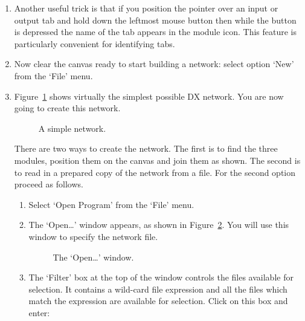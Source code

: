 \documentclass[twoside,11pt]{article}
\begin{document}
\begin{enumerate}
  \item Another useful trick is that if you position the pointer over
   an input or output tab and hold down the leftmost mouse button then
   while the button is depressed the name of the tab appears in the
   module icon. This feature is particularly convenient for identifying
   tabs.

  \item Now clear the canvas ready to start building a network: select
   option `New' from the `File' menu.

  \item Figure~\ref{SIMPLE} shows virtually the simplest possible DX
   network. You are now going to create this network.

  \begin{figure}[htbp]

  \begin{center}
  \leavevmode
  \epsfxsize=139pt
  \end{center}

  \caption[A simple network.]{A simple network. \label{SIMPLE} }

  \end{figure}

   There are two ways to create the network. The first is to find the
   three modules, position them on the canvas and join them as shown.
   The second is to read in a prepared copy of the network from a file.
   For the second option proceed as follows.

  \begin{enumerate}

    \item Select `Open Program' from the `File' menu.

    \item The `Open\ldots' window appears, as shown in
     Figure~\ref{OPEN}. You will use this window to specify the network
     file.

    \newpage
    \begin{figure}[htbp]

    \begin{center}
    \leavevmode
    \epsfxsize=450pt
    \end{center}

    \caption[The `Open\ldots' window.]{The `Open\ldots' window.
    \label{OPEN} }


    \end{figure}

    \item The `Filter' box at the top of the window controls the files
     available for selection. It contains a wild-card file expression
     and all the files which match the expression are available for
     selection. Click on this box and enter:


\end{enumerate}
\end{enumerate}
\end{document}
